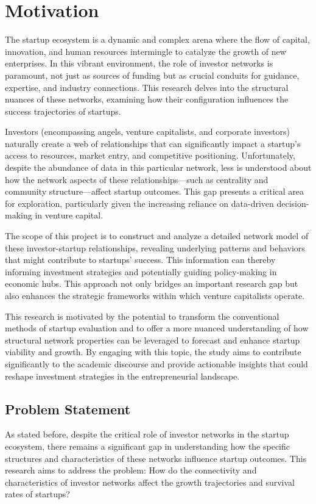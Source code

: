 \documentclass[a4paper,11pt]{article}
\begin{document}
\section{Motivation}
The startup ecosystem is a dynamic and complex arena where the flow of capital, innovation, and human resources intermingle to catalyze the growth of new enterprises. In this vibrant environment, the role of investor networks is paramount, not just as sources of funding but as crucial conduits for guidance, expertise, and industry connections. This research delves into the structural nuances of these networks, examining how their configuration influences the success trajectories of startups.

Investors (encompassing angels, venture capitalists, and corporate investors) naturally create a web of relationships that can significantly impact a startup’s access to resources, market entry, and competitive positioning. Unfortunately, despite the abundance of data in this particular network, less is understood about how the network aspects of these relationships—such as centrality and community structure—affect startup outcomes. This gap presents a critical area for exploration, particularly given the increasing reliance on data-driven decision-making in venture capital.

The scope of this project is to construct and analyze a detailed network model of these investor-startup relationships, revealing underlying patterns and behaviors that might contribute to startups' success. This information can thereby informing investment strategies and potentially guiding policy-making in economic hubs. This approach not only bridges an important research gap but also enhances the strategic frameworks within which venture capitalists operate.

This research is motivated by the potential to transform the conventional methods of startup evaluation and to offer a more nuanced understanding of how structural network properties can be leveraged to forecast and enhance startup viability and growth. By engaging with this topic, the study aims to contribute significantly to the academic discourse and provide actionable insights that could reshape investment strategies in the entrepreneurial landscape.

\subsection{Problem Statement}
As stated before, despite the critical role of investor networks in the startup ecosystem, there remains a significant gap in understanding how the specific structures and characteristics of these networks influence startup outcomes. This research aims to address the problem: How do the connectivity and characteristics of investor networks affect the growth trajectories and survival rates of startups?
\end{document}
